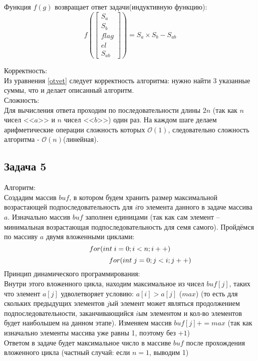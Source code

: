 \documentclass[a4paper,12pt]{article} %
\begin{document}
Функция $f(g)$ возвращает ответ задачи(индуктивную функцию):
$$f\left(\left[\begin{array}{c}{S_a} \\ {S_b} \\ {flag}\\ el \\ S_{ab}\end{array}\right]\right)= S_a \times S_b - S_{ab}$$

Корректность:\\
Из уравнения \eqref{otvet} следует корректность алгоритма: нужно найти 3 указанные суммы, что и делает описанный алгоритм.\\

Сложность:\\
Для вычисления ответа проходим по последовательности длины $ 2n $ (так как $ n $ чисел <<$ a $>> и $ n $ чисел <<$ b $>>) один раз. На каждом шаге делаем арифметические операции сложность которых $\mathcal{O}(1)$, следовательно сложность алгоритма - $\mathcal{O}(n)$(линейная).



\subsection*{Задача 5}
Алгоритм:\\
Создадим массив $ buf $, в котором будем хранить размер максимальной возрастающей подпоследовательность для $ i $го элемента данного в задаче массива $ a $. Изначально массив $ buf $ заполнен единицами (так как сам элемент -- минимальная возрастающая подпоследовательность для семя самого). Пройдёмся по массиву $ a $ двумя вложенными циклами:
$$ for (int \hspace{0.1cm}  i = 0; i < n; i++)$$
$$\hspace{2cm}  for (int \hspace{0.1cm} j = 0; j < i; j++)$$
Принцип динамического программирования:\\
Внутри этого вложенного цикла, находим максимальное из чисел $ buf[j] $, таких что элемент $ a[j] $ удволетворяет условию: $ a[i] > a[j] $ ($ max $) (то есть для скольких предыдущих элементов $ j $ый элемент может являться продолжением подпоследовательности, заканчивающийся $ i $ым элементом и кол-во элементов будет наибольшем на данном этапе). Изменяем массив $ buf[j] += max$ (так как изначально элементы массива уже равны 1, поэтому без $ +1 $)\\
Ответом в задаче будет максимальное число в массиве $ buf $ после прохождения вложенного цикла (частный случай: если $ n = 1 $, выводим 1)\\
\end{document}
